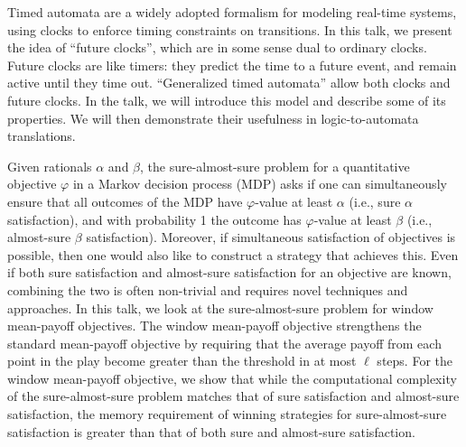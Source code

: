 \documentclass[a4paper,UKenglish]{dagrep-v2021}
\begin{document}

Timed automata are a widely adopted formalism for modeling real-time systems, using clocks to enforce timing constraints on transitions. In this talk, we present the idea of ``future clocks'', which are in some sense dual to ordinary clocks. Future clocks are like timers: they predict the time to a future event, and remain active until they time out. ``Generalized timed automata'' allow both clocks and future clocks. In the talk, we will introduce this model and describe some of its properties. We will then demonstrate their usefulness in logic-to-automata translations.


Given rationals $\alpha$ and $\beta$, the sure-almost-sure problem for a quantitative objective $\varphi$ in a Markov decision process (MDP) asks if one can simultaneously ensure that all outcomes of the MDP have $\varphi$-value at least $\alpha$ (i.e., sure $\alpha$ satisfaction), and with probability 1 the outcome has $\varphi$-value at least $\beta$ (i.e., almost-sure $\beta$ satisfaction). Moreover, if simultaneous satisfaction of objectives is possible, then one would also like to construct a strategy that achieves this. Even if both sure satisfaction and almost-sure satisfaction for an objective are known, combining the two is often non-trivial and requires novel techniques and approaches. In this talk, we look at the sure-almost-sure problem for window mean-payoff objectives. The window mean-payoff objective strengthens the standard mean-payoff objective by requiring that the average payoff from each point in the play become greater than the threshold in at most $\ell$ steps. For the window mean-payoff objective, we show that while the computational complexity of the sure-almost-sure problem matches that of sure satisfaction and almost-sure satisfaction, the memory requirement of winning strategies for sure-almost-sure satisfaction is greater than that of both sure and almost-sure satisfaction.

\end{document}

